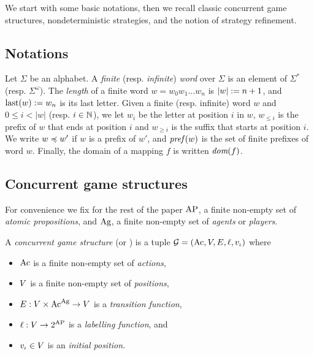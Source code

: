 We start with some basic notations, then we recall classic concurrent game structures, nondeterministic
strategies, and the notion of strategy refinement.

\subsection{Notations}
Let $\Sigma$ be an alphabet. A \emph{finite} (resp. \emph{infinite}) \emph{word} over $\Sigma$ is an element
of $\Sigma^{*}$ (resp. $\Sigma^{\omega}$). 
The \emph{length} of a finite word $w=w_{0}w_{1}\ldots
w_{n}$ is $|w|:= n+1$, and $\mbox{last}(w):= w_{n}$ is its last
letter.
Given a finite (resp. infinite) word $w$ and $0 \leq i < |w|$  (resp. $i\in\mathbb N$), we let $w_{i}$ be the
letter at position $i$ in $w$, $w_{\leq i}$ is the prefix of $w$ that
ends at position $i$ and $w_{\geq i}$ is the suffix that starts
at position $i$.
We write $w\preccurlyeq w'$ if $w$ is a prefix of $w'$, and $\textit{pref}\,(w)$ is
the set of finite prefixes of word $w$. 
Finally, 
the domain of a mapping $f$ is written $\textit{dom}(f)$.

\subsection{Concurrent game structures}
\label{sec-CGS}

For convenience we fix for the rest of the paper $\textnormal{AP}$, a finite non-empty set of
\emph{atomic propositions}, and $\textnormal{Ag}$, a finite non-empty set of \emph{agents} or
\emph{players}.

\begin{definition}%
  \label{def-CGS}
  A \emph{concurrent game structure} (or
  \CGS) is a tuple
  $\CGS=(\Act,\setpos,\trans,\val,\pos_\init)$ where
   \begin{itemize}
    \item $\textnormal{Ac}$ is a finite non-empty set of \emph{actions},
    \item $V$ is a finite non-empty set of \emph{positions},
   \item $E:V\times \textnormal{Ac}^{\textnormal{Ag}}\to V$ is a \emph{transition function}, 
  \item $\ell:V\to 2^{\textnormal{AP}}$ is a \emph{labelling function}, and
  \item $v_{\iota} \in V$ is an \emph{initial position}.
  \end{itemize}
\end{definition}

